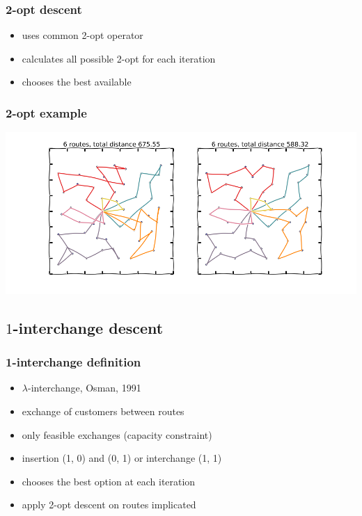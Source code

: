 \documentclass{beamer}
\begin{document}
\begin{frame}
\frametitle{2-opt descent}
\begin{itemize}
	\item uses common 2-opt operator
	\item calculates all possible 2-opt for each iteration
	\item chooses the best available
\end{itemize}
\end{frame}

\begin{frame}
\frametitle{2-opt example}
\begin{center}
\includegraphics[scale=0.3]{figs/2opt}

\end{center}
\end{frame}


\subsection{$1$-interchange descent}

\begin{frame}
\frametitle{1-interchange definition}
\begin{itemize}
	\item $\lambda$-interchange, Osman, 1991
	\item exchange of customers between routes
	\item only feasible exchanges (capacity constraint)
	\item insertion (1, 0) and (0, 1) or interchange (1, 1)
	\item chooses the best option at each iteration
	\item apply 2-opt descent on routes implicated
\end{itemize}
\end{frame}
\end{document}
